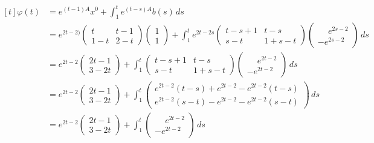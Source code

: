 \documentclass[11pt]{report}
\begin{document}
\[\begin{aligned}[t]
    \varphi(t)&=e^{(t-1)A}x^0+\int_{1}^t e^{(t-s)A}b(s) \, ds \\
    &=e^{2t-2)}\begin{pmatrix}
        t & t-1 \\
        1-t & 2-t
    \end{pmatrix} \begin{pmatrix}
        1 \\
        1
    \end{pmatrix}+\int_1^te^{2t-2s}\begin{pmatrix}
        t-s+1 & t-s \\
        s-t & 1+s-t
    \end{pmatrix}\begin{pmatrix}
        \phantom{-}e^{2s-2} \\
        -e^{2s-2}
    \end{pmatrix} \, ds \\
    &=e^{2t-2}\begin{pmatrix}
        2t-1 \\
        3-2t
    \end{pmatrix}+\int_1^t\begin{pmatrix}
        t-s+1 & t-s \\
        s-t & 1+s-t
    \end{pmatrix}\begin{pmatrix}
        \phantom{-}e^{2t-2} \\
        -e^{2t-2}
    \end{pmatrix} \, ds \\
    &=e^{2t-2}\begin{pmatrix}
        2t-1 \\
        3-2t
    \end{pmatrix}+\int_1^t\begin{pmatrix}
        e^{2t-2}(t-s)+e^{2t-2}-e^{2t-2}(t-s) \\
        e^{2t-2}(s-t)-e^{2t-2}-e^{2t-2}(s-t)
    \end{pmatrix} \, ds \\
    &= e^{2t-2}\begin{pmatrix}
        2t-1 \\
        3-2t
    \end{pmatrix}+\int_1^t\begin{pmatrix}
        \phantom{-}e^{2t-2} \\
        -e^{2t-2}
    \end{pmatrix} \, ds \\

\end{aligned}\]
\end{document}
